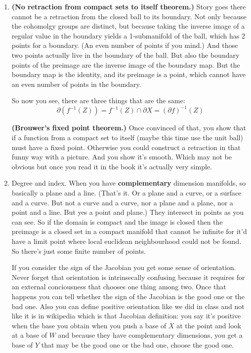 \begin{enumerate}
\item \textbf{(No retraction from compact sets to itself theorem.)} Story goes there cannot be a retraction from the closed ball to its boundary. Not only because the cohomolgy groups are distinct, but because taking the inverse image of a regular value in the boundary yields a 1-submanifold of the ball, which has 2 points for a boundary. (An even number of points if you mind.) And those two points actually live in the boundary of the ball. But also the boundary points of the preimage are the inverse image of the boundary map. But the boundary map is the identity, and its preimage is a point, which cannot have an even number of points in the boundary.

	So now you see, there are three things that are the same:
	\[\partial (f^{-1}(Z)) = f^{-1}(Z) \cap \partial X = (\partial f)^{-1}(Z)\]

	\textbf{(Brouwer's fixed point theorem.)} Once convinced of that, you show that if a function from a compact set to itself (maybe this time use the unit ball) must have a fixed point. Otherwise you could construct a retraction in that funny way with a picture. And you show it's smooth. Which may not be obvious but once you read it in the book it's actually very simple.

	\item Degree and index. When you have \textbf{complementary} dimension manifolds, so basically a plane and a line. (That's it. Or a plane and a curve, or a surface and a curve. But not a curve and a curve, nor a plane and a plane, nor a point and a line. But yes a point and plane.) They intersect in points as you can see. So if the domain is compact and the image is closed then the preimage is a closed set in a compact manifold that cannot be infinite for it'd have a limit point where local euclidean neighbourhood could not be found. So there's just some finite number of points.

		If you consider the sign of the Jacobian you get some sense of orientation. Never forget that orientation is intrinsecally confusing because it requires for an external conciousness that chooses one thing among two. Once that happens you can tell whether the sign of the Jacobian is the good one or the bad one. Also you can define positive orientation like we did in class and not like it is in wikipedia which is that Jacobian definition: you say it's positive when the base you obtain when you push a base of \(X\) at the point and look at a base of \(W\) and because they have complementary dimensions, you get a base of \(Y\) that may be the good one or the bad one, choose the good one.


\end{enumerate}
